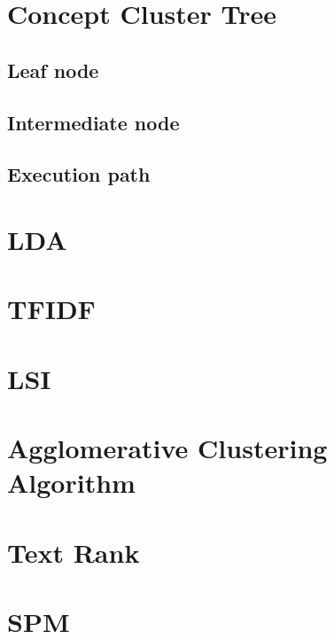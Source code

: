 \section{Concept Cluster Tree}
\subsection{Leaf node}
\subsection{Intermediate node}
\subsection{Execution path}
\section{LDA}
\section{TFIDF}
\section{LSI}
\section{Agglomerative Clustering Algorithm}
\section{Text Rank}
\section{SPM}